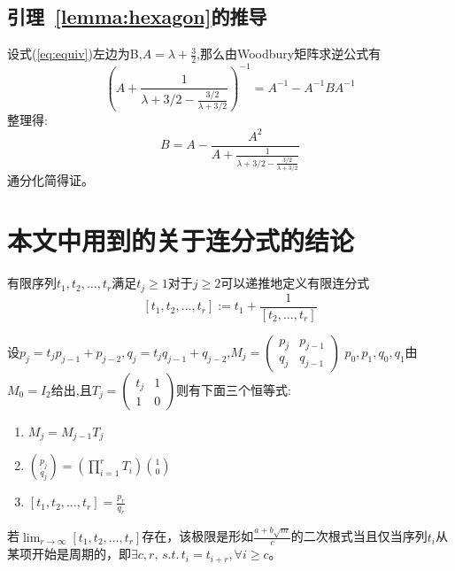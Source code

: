 \subsection{引理~\ref{lemma:hexagon}的推导}\label{B_F_4}
  设式(\ref{eq:equiv})左边为B,$A=\lambda+\frac{3}{2}$,那么由Woodbury矩阵求逆公式有
  \[
  (A+\frac{1}{\lambda+3/2-\frac{3/2}{\lambda+3/2}})^{-1}=A^{-1}-A^{-1}BA^{-1}
  \]
  整理得:
  \[
  B=A-\frac{A^2}{A+\frac{1}{\lambda+3/2-\frac{3/2}{\lambda+3/2}}}
  \]
  通分化简得证。
\section{本文中用到的关于连分式的结论}\label{C_F}
\begin{definition}
  有限序列$t_1,t_2,\dots,t_r$满足$t_j\geq 1$对于$j\geq2$可以递推地定义有限连分式
  \[[t_1,t_2,\dots,t_r]:=t_1+\frac{1} {[t_2,\dots,t_r]}\]
\end{definition}
\begin{theorem}\label{thm:basic}
  设$p_j=t_j p_{j-1}+p_{j-2},q_j=t_j q_{j-1}+q_{j-2}$,$M_j=\left(\begin{matrix}p_j&p_{j-1}\\q_j&q_{j-1}\end{matrix}\right)$
  $p_0,p_1,q_0,q_1$由$M_0=I_2$给出,且$T_j=\left(\begin{matrix}t_j&1\\1&0\end{matrix}\right)$则有下面三个恒等式:
  \begin{enumerate}
    \item $M_j=M_{j-1}T_j$
    \item $\binom{p_j}{q_j}=(\prod_{i=1}^r T_i )\binom{1}{0}$
    \item $[t_1,t_2,\dots,t_r]=\frac{p_r}{q_r}$
  \end{enumerate}
\end{theorem}
\begin{theorem}\label{theorem:quadratic_cyclic}
若$\lim_{r\to \infty}[t_1,t_2,\dots,t_r]$存在，该极限是形如$\frac{a+b\sqrt{m}}{c}$的二次根式当且仅当序列$t_i$从某项开始是周期的，即$\exists c,r,\,s.t.\, t_{i}=t_{i+r},\forall i\geq c$。
\end{theorem}
